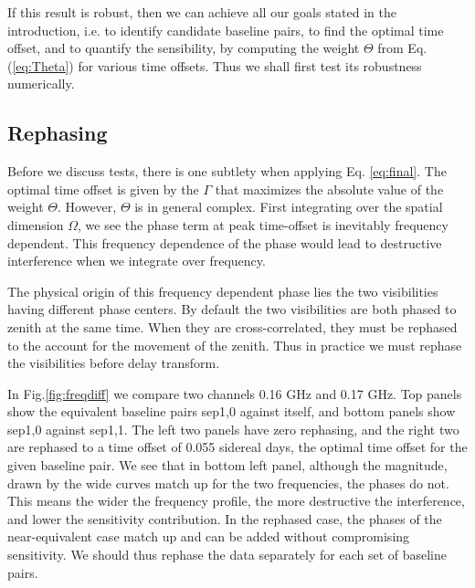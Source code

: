 \documentclass[preprint2,numberedappendix,tighten,twocolappendix]{aastex6}  %
\renewcommand\[{\begin{equation}}
\renewcommand\]{\end{equation}}
\begin{document}
If this result is robust, then we can achieve all our goals stated in the introduction, i.e. to identify 
candidate baseline pairs, to find the optimal time offset, and to quantify the sensibility, by computing the weight $\Theta$ from
Eq.(\ref{eq:Theta}) for various time offsets. Thus we shall first test its robustness numerically.

\subsection{Rephasing \label{sec:rephs}}
Before we discuss tests, there is one subtlety when applying Eq. \ref{eq:final}. The optimal time offset is given by the $\Gamma$ that maximizes the absolute value of the weight $\Theta$. However, $\Theta$ is in general complex. First integrating over the spatial dimension $\Omega$, we see the phase term at peak time-offset is inevitably frequency dependent. This frequency dependence of the phase would lead to destructive interference when we integrate over frequency.

The physical origin of this frequency dependent phase lies the two visibilities having different phase centers. By default the two visibilities are both phased to zenith at the same time. When they are cross-correlated, they must be rephased to the account for the movement of the zenith. Thus in practice we must rephase the visibilities before delay transform. 


In Fig.\ref{fig:freqdiff} we compare two channels 0.16 GHz and 0.17 GHz.  Top panels show the equivalent baseline pairs sep1,0 against itself, and bottom panels show sep1,0 against sep1,1. The left two panels have zero rephasing, and the right two are rephased to a time offset of 0.055 sidereal days, the optimal time offset for the given baseline pair. We see that in bottom left panel, although the magnitude, drawn by the wide curves match up for the two frequencies, the phases do not. This means the wider the frequency profile, the more destructive the interference, and lower the sensitivity contribution. In the rephased case, the phases of the near-equivalent case match up and can be added without compromising sensitivity. We should thus rephase the data separately for each set of baseline pairs. 
\end{document}
